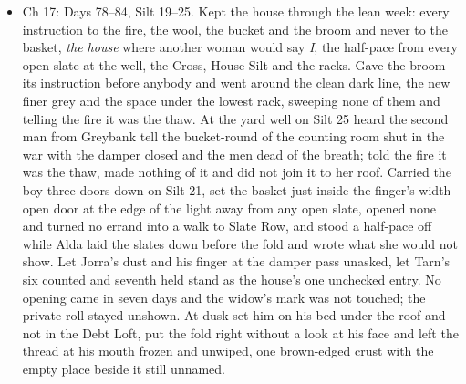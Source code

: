 \documentclass{design/chronicle}
\begin{document}
{\begin{itemize}[leftmargin=1.4em,itemsep=1pt,topsep=3pt,parsep=0pt]
\end{itemize}

\begin{itemize}[leftmargin=1.4em,itemsep=1pt,topsep=3pt,parsep=0pt]

\item Ch 17: Days 78–84, Silt 19–25. Kept the house through the lean week: every instruction to the fire, the wool, the bucket and the broom and never to the basket, \emph{the house} where another woman would say \emph{I}, the half-pace from every open slate at the well, the Cross, House Silt and the racks. Gave the broom its instruction before anybody and went around the clean dark line, the new finer grey and the space under the lowest rack, sweeping none of them and telling the fire it was the thaw. At the yard well on Silt 25 heard the second man from Greybank tell the bucket-round of the counting room shut in the war with the damper closed and the men dead of the breath; told the fire it was the thaw, made nothing of it and did not join it to her roof. Carried the boy three doors down on Silt 21, set the basket just inside the finger’s-width-open door at the edge of the light away from any open slate, opened none and turned no errand into a walk to Slate Row, and stood a half-pace off while Alda laid the slates down before the fold and wrote what she would not show. Let Jorra’s dust and his finger at the damper pass unasked, let Tarn’s six counted and seventh held stand as the house’s one unchecked entry. No opening came in seven days and the widow’s mark was not touched; the private roll stayed unshown. At dusk set him on his bed under the roof and not in the Debt Loft, put the fold right without a look at his face and left the thread at his mouth frozen and unwiped, one brown-edged crust with the empty place beside it still unnamed.

\end{itemize}

\begin{itemize}[leftmargin=1.4em,itemsep=1pt,topsep=3pt,parsep=0pt]


\end{itemize}}
\end{document}
